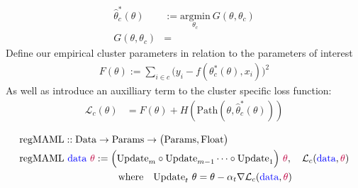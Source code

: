 \documentclass[a4paper,12pt]{article}
\begin{document}
 
\begin{align*}
    \hat{\theta}_c^*(\theta) &:= \underset{\theta_c}{\textrm{argmin}} \ G(\theta, \theta_c)  \\
    G(\theta, \theta_c)&= 
\end{align*}
Define our empirical cluster parameters in relation to the parameters of interest 
\begin{align*}
    F(\theta) := \sum _{i \in c}\big(y_i - f(\theta_c^*(\theta), x_i)\big)^2
\end{align*}
As well as introduce an auxilliary term to the cluster specific loss function: 
\begin{align*}
    \mathcal{L}_{c}(\theta) &= F(\theta) + H(\textrm{Path}(\theta, \hat{\theta}^*_c(\theta)))
\end{align*}

\begin{align*} 
&\text{regMAML} :: \text{Data} \rightarrow \text{Params} \rightarrow \big(\textrm{Params}, \text{Float}\big) \\
&\text{regMAML} \ \textcolor{blue}{\text{data}} \ \textcolor{purple}{\theta} := \Big(\text{Update}_m \circ \text{Update}_{m-1} \dots \circ \text{Update}_1 \Big) \ \textcolor{purple}{\theta}, \quad \mathcal{L}_c(\textcolor{blue}{\text{data}}, \textcolor{purple}{\theta})  \\ 
&  \quad \quad \quad \quad \quad \quad \quad \quad \quad \quad \text{where} \quad  \text{Update}_t \  \theta = \theta - \alpha_t \nabla \mathcal{L}_c(\textcolor{blue}{\text{data}}, \textcolor{purple}{\theta})
\end{align*}
\end{document}
